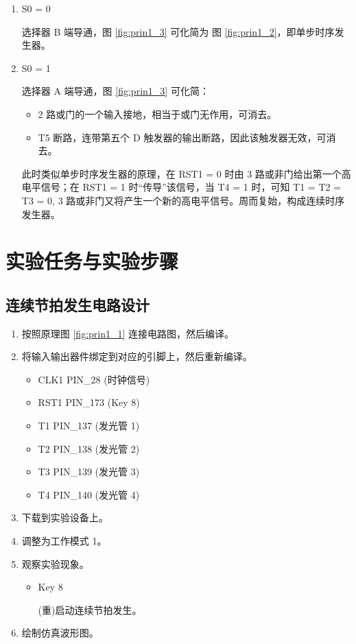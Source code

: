 \begin{enumerate}
    \item S0 = 0
    
    选择器 B 端导通，图 \ref{fig:prin1_3} 可化简为 图 \ref{fig:prin1_2}，即单步时序发生器。
    
    \item S0 = 1
    
    选择器 A 端导通，图 \ref{fig:prin1_3} 可化简：
    
    \begin{itemize}
        \item 2 路或门的一个输入接地，相当于或门无作用，可消去。
        \item T5 断路，连带第五个 D 触发器的输出断路，因此该触发器无效，可消去。
    \end{itemize}
    
    此时类似单步时序发生器的原理，在 RST1 = 0 时由 3 路或非门给出第一个高电平信号；在 RST1 = 1 时“传导”该信号，当 T4 = 1 时，可知 T1 = T2 = T3 = 0, 3 路或非门又将产生一个新的高电平信号。周而复始，构成连续时序发生器。
        
\end{enumerate}

\section{实验任务与实验步骤}

\subsection{连续节拍发生电路设计}

\begin{enumerate}
    \item 按照原理图 \ref{fig:prin1_1} 连接电路图，然后编译。
    \item 将输入输出器件绑定到对应的引脚上，然后重新编译。
    
    \begin{itemize}
        \item CLK1 PIN\_28 (时钟信号)
        \item RST1 PIN\_173 (Key 8)
        \item T1 PIN\_137 (发光管 1)
        \item T2 PIN\_138 (发光管 2)
        \item T3 PIN\_139 (发光管 3)
        \item T4 PIN\_140 (发光管 4)
    \end{itemize}
    
    \item 下载到实验设备上。
    \item 调整为工作模式 1。
    \item 观察实验现象。
    
    \begin{itemize}
        \item Key 8
        
        (重)启动连续节拍发生。
        
    \end{itemize}
    \item 绘制仿真波形图。
\end{enumerate}

